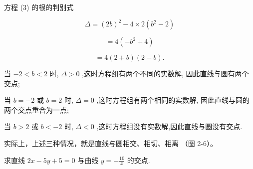 \documentclass[lang=cn,newtx,12pt,scheme=chinese]{elegantbook}
\begin{document}
方程 (3) 的根的判别式

\[
  \Delta = {\left( 2b\right) }^{2} - 4 \times 2\left( {{b}^{2} - 2}\right)
\]

\[
  = 4\left( {-{b}^{2} + 4}\right)
\]

\[
  = 4\left( {2 + b}\right) \left( {2 - b}\right) \text{.}
\]

当 \(- 2 < b < 2\) 时, \(\Delta > 0\) ,这时方程组有两个不同的实数解, 因此直线与圆有两个交点;

当 \(b = - 2\) 或 \(b = 2\) 时, \(\Delta = 0\) ,这时方程组有两个相同的实数解, 因此直线与圆的两个交点重合为一点;

当 \(b > 2\) 或 \(b < - 2\) 时, \(\Delta < 0\) ,这时方程组没有实数解,因此直线与圆没有交点.

实际上，上述三种情况，就是直线与圆相交、相切、相离 （图 2-6）。

\begin{problemset}[练习]

\item 求直线 \({2x} - {5y} + 5 = 0\) 与曲线 \(y = - \frac{10}{x}\) 的交点.
\end{problemset}
\end{document}
